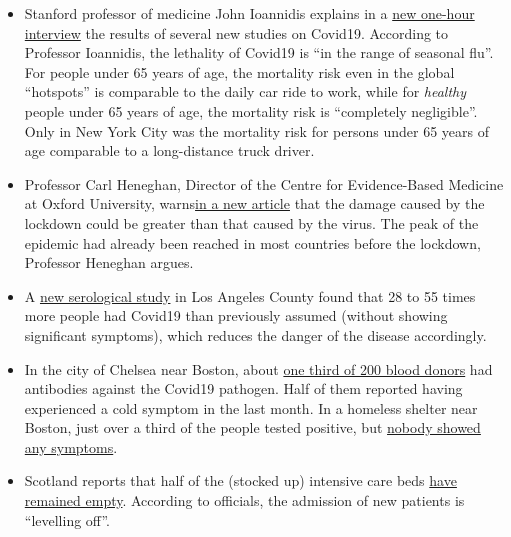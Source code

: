 \begin{itemize}
\tightlist
\item
  Stanford professor of medicine John Ioannidis explains in a
  \href{https://www.youtube.com/watch?v=cwPqmLoZA4s}{new one-hour
  interview} the results of several new studies on Covid19. According to
  Professor Ioannidis, the lethality of Covid19 is ``in the range of
  seasonal flu''. For people under 65 years of age, the mortality risk
  even in the global ``hotspots'' is comparable to the daily car ride to
  work, while for \emph{healthy} people under 65 years of age, the
  mortality risk is ``completely negligible''. Only in New York City was
  the mortality risk for persons under 65 years of age comparable to a
  long-distance truck driver.
\item
  Professor Carl Heneghan, Director of the Centre for Evidence-Based
  Medicine at Oxford University,
  warns\href{https://news.yahoo.com/lockdown-damage-outweighs-coronavirus-warning-121940675.html}{in
  a new article} that the damage caused by the lockdown could be greater
  than that caused by the virus. The peak of the epidemic had already
  been reached in most countries before the lockdown, Professor Heneghan
  argues.
\item
  A
  \href{http://publichealth.lacounty.gov/phcommon/public/media/mediapubhpdetail.cfm?prid=2328}{new
  serological study} in Los Angeles County found that 28 to 55 times
  more people had Covid19 than previously assumed (without showing
  significant symptoms), which reduces the danger of the disease
  accordingly.
\item
  In the city of Chelsea near Boston, about
  \href{https://archive.is/20200418222442/https://www.bostonglobe.com/2020/04/17/business/nearly-third-200-blood-samples-taken-chelsea-show-exposure-coronavirus/}{one
  third of 200 blood donors} had antibodies against the Covid19
  pathogen. Half of them reported having experienced a cold symptom in
  the last month. In a homeless shelter near Boston, just over a third
  of the people tested positive, but
  \href{https://www.wsbtv.com/news/trending/coronavirus-cdc-reviewing-stunning-universal-testing-results-boston-homeless-shelter/ZADQ45HCAZEVJAZA3OTCUR7M6M/}{nobody
  showed any symptoms}.
\item
  Scotland reports that half of the (stocked up) intensive care beds
  \href{https://www.heraldscotland.com/news/18377095.coronavirus-scotland-half-icu-beds-empty/}{have
  remained empty}. According to officials, the admission of new patients
  is ``levelling off''.

\end{itemize}
